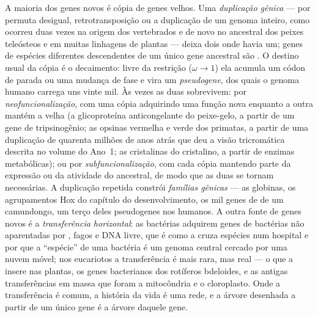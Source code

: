 \begin{definition}\label{def:b3:molecular-evolution:duplication}
A maioria dos genes novos é cópia de genes velhos. Uma \emph{duplicação
gênica} --- por permuta desigual, retrotransposição ou a duplicação de um
genoma inteiro, como ocorreu duas vezes na origem dos vertebrados e de
novo no ancestral dos peixes teleósteos e em muitas linhagens de plantas
--- deixa dois  onde havia um; genes de espécies
diferentes descendentes de um único gene ancestral são .
O destino usual da cópia é o decaimento: livre da restrição ($\omega \to 1$) ela acumula um códon de parada ou uma mudança de fase e vira um
\emph{pseudogene}, dos quais o genoma humano carrega uns vinte mil. Às
vezes as duas sobrevivem: por \emph{neofuncionalização}, com uma cópia
adquirindo uma função nova enquanto a outra mantém a velha (a
glicoproteína anticongelante do peixe-gelo, a partir de um gene de
tripsinogênio; as opsinas vermelha e verde dos primatas, a partir de uma
duplicação de quarenta milhões de anos atrás que deu a visão tricromática
descrita no volume do Ano~1; as cristalinas do cristalino, a partir de
enzimas metabólicas); ou por \emph{subfuncionalização}, com cada cópia
mantendo parte da expressão ou da atividade do ancestral, de modo que as
duas se tornam necessárias. A duplicação repetida constrói \emph{famílias
gênicas} --- as globinas, os agrupamentos Hox do capítulo do
desenvolvimento, os mil genes de  de um camundongo,
um terço deles pseudogenes nos humanos. A outra fonte de genes novos é a
\emph{transferência horizontal}: as bactérias adquirem genes de bactérias
não aparentadas por , fagos e DNA livre, que é como a
 cruza espécies num hospital e por que a
``espécie'' de uma bactéria é um genoma central cercado por uma nuvem
móvel; nos eucariotos a transferência é mais rara, mas real --- o 
que a \emph{} insere nas plantas, os genes bacterianos dos
rotíferos bdeloides, e as antigas transferências em massa que foram a
mitocôndria e o cloroplasto. Onde a transferência é comum, a história da
vida é uma rede, e a árvore desenhada a partir de um único gene é a
árvore daquele gene.
\end{definition}

